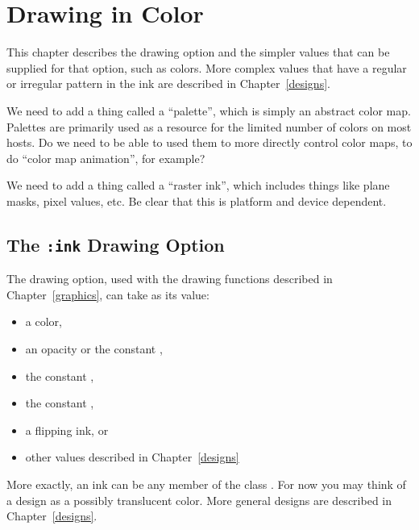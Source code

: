 
\chapter {Drawing in Color}
\label {color}

This chapter describes the  drawing option and the simpler values that
can be supplied for that option, such as colors.  More complex values that have
a regular or irregular pattern in the ink are described in Chapter~\ref{designs}.

 {We need to add a thing called a ``palette'', which is simply an
abstract color map.  Palettes are primarily used as a resource for the limited
number of colors on most hosts.  Do we need to be able to used them to more
directly control color maps, to do ``color map animation'', for example?}

 {We need to add a thing called a ``raster ink'', which includes
things like plane masks, pixel values, etc.  Be clear that this is platform and
device dependent.}


\section {The {\tt :ink} Drawing Option}

The  drawing option, used with the drawing functions described in
Chapter~\ref{graphics}, can take as its value:
\begin{itemize}
\item a color,

\item an opacity or the constant ,

\item the constant ,

\item the constant ,

\item a flipping ink, or

\item other values described in Chapter~\ref{designs}
\end{itemize}

More exactly, an ink can be any member of the class .  For now you
may think of a design as a possibly translucent color.  More general designs are
described in Chapter~\ref{designs}.

